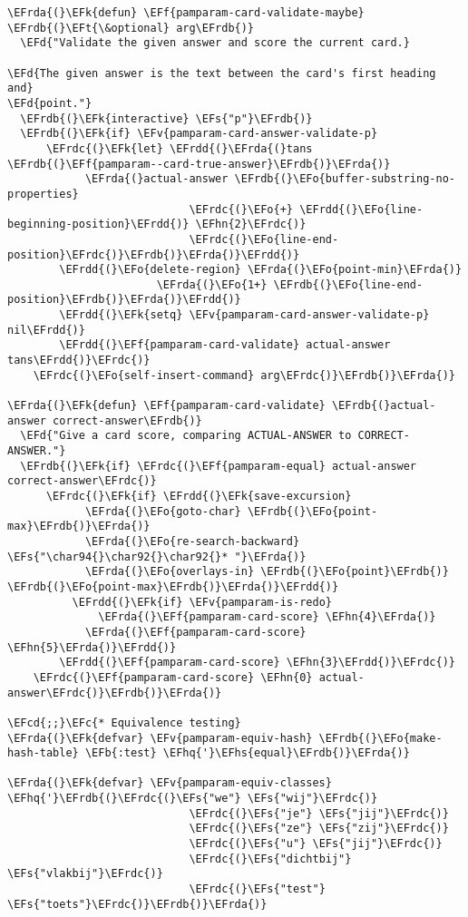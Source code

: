 \documentclass[a4wide,10pt]{article}
\newcommand{\EFc}[1]{\textcolor{EFc}{#1}} %
\newcommand{\EFcd}[1]{\textcolor{EFcd}{#1}} %
\newcommand{\EFs}[1]{\textcolor{EFs}{#1}} %
\newcommand{\EFd}[1]{\textcolor{EFd}{#1}} %
\newcommand{\EFk}[1]{\textcolor{EFk}{#1}} %
\newcommand{\EFb}[1]{\textcolor{EFb}{#1}} %
\newcommand{\EFf}[1]{\textcolor{EFf}{#1}} %
\newcommand{\EFv}[1]{\textcolor{EFv}{#1}} %
\newcommand{\EFt}[1]{\textcolor{EFt}{#1}} %
\newcommand{\EFo}[1]{\textcolor{EFo}{#1}} %
\newcommand{\EFhn}[1]{\textcolor{EFhn}{\textbf{#1}}} %
\newcommand{\EFhq}[1]{\textcolor{EFhq}{#1}} %
\newcommand{\EFhs}[1]{\textcolor{EFhs}{#1}} %
\newcommand{\EFrda}[1]{\textcolor{EFrda}{#1}} %
\newcommand{\EFrdb}[1]{\textcolor{EFrdb}{#1}} %
\newcommand{\EFrdc}[1]{\textcolor{EFrdc}{#1}} %
\newcommand{\EFrdd}[1]{\textcolor{EFrdd}{#1}} %
\begin{document}
\begin{Code}
\begin{Verbatim}
\EFrda{(}\EFk{defun} \EFf{pamparam-card-validate-maybe} \EFrdb{(}\EFt{\&optional} arg\EFrdb{)}
  \EFd{"Validate the given answer and score the current card.}

\EFd{The given answer is the text between the card's first heading and}
\EFd{point."}
  \EFrdb{(}\EFk{interactive} \EFs{"p"}\EFrdb{)}
  \EFrdb{(}\EFk{if} \EFv{pamparam-card-answer-validate-p}
      \EFrdc{(}\EFk{let} \EFrdd{(}\EFrda{(}tans \EFrdb{(}\EFf{pamparam--card-true-answer}\EFrdb{)}\EFrda{)}
            \EFrda{(}actual-answer \EFrdb{(}\EFo{buffer-substring-no-properties}
                            \EFrdc{(}\EFo{+} \EFrdd{(}\EFo{line-beginning-position}\EFrdd{)} \EFhn{2}\EFrdc{)}
                            \EFrdc{(}\EFo{line-end-position}\EFrdc{)}\EFrdb{)}\EFrda{)}\EFrdd{)}
        \EFrdd{(}\EFo{delete-region} \EFrda{(}\EFo{point-min}\EFrda{)}
                       \EFrda{(}\EFo{1+} \EFrdb{(}\EFo{line-end-position}\EFrdb{)}\EFrda{)}\EFrdd{)}
        \EFrdd{(}\EFk{setq} \EFv{pamparam-card-answer-validate-p} nil\EFrdd{)}
        \EFrdd{(}\EFf{pamparam-card-validate} actual-answer tans\EFrdd{)}\EFrdc{)}
    \EFrdc{(}\EFo{self-insert-command} arg\EFrdc{)}\EFrdb{)}\EFrda{)}

\EFrda{(}\EFk{defun} \EFf{pamparam-card-validate} \EFrdb{(}actual-answer correct-answer\EFrdb{)}
  \EFd{"Give a card score, comparing ACTUAL-ANSWER to CORRECT-ANSWER."}
  \EFrdb{(}\EFk{if} \EFrdc{(}\EFf{pamparam-equal} actual-answer correct-answer\EFrdc{)}
      \EFrdc{(}\EFk{if} \EFrdd{(}\EFk{save-excursion}
            \EFrda{(}\EFo{goto-char} \EFrdb{(}\EFo{point-max}\EFrdb{)}\EFrda{)}
            \EFrda{(}\EFo{re-search-backward} \EFs{"\char94{}\char92{}\char92{}* "}\EFrda{)}
            \EFrda{(}\EFo{overlays-in} \EFrdb{(}\EFo{point}\EFrdb{)} \EFrdb{(}\EFo{point-max}\EFrdb{)}\EFrda{)}\EFrdd{)}
          \EFrdd{(}\EFk{if} \EFv{pamparam-is-redo}
              \EFrda{(}\EFf{pamparam-card-score} \EFhn{4}\EFrda{)}
            \EFrda{(}\EFf{pamparam-card-score} \EFhn{5}\EFrda{)}\EFrdd{)}
        \EFrdd{(}\EFf{pamparam-card-score} \EFhn{3}\EFrdd{)}\EFrdc{)}
    \EFrdc{(}\EFf{pamparam-card-score} \EFhn{0} actual-answer\EFrdc{)}\EFrdb{)}\EFrda{)}

\EFcd{;;}\EFc{* Equivalence testing}
\EFrda{(}\EFk{defvar} \EFv{pamparam-equiv-hash} \EFrdb{(}\EFo{make-hash-table} \EFb{:test} \EFhq{'}\EFhs{equal}\EFrdb{)}\EFrda{)}

\EFrda{(}\EFk{defvar} \EFv{pamparam-equiv-classes} \EFhq{'}\EFrdb{(}\EFrdc{(}\EFs{"we"} \EFs{"wij"}\EFrdc{)}
                            \EFrdc{(}\EFs{"je"} \EFs{"jij"}\EFrdc{)}
                            \EFrdc{(}\EFs{"ze"} \EFs{"zij"}\EFrdc{)}
                            \EFrdc{(}\EFs{"u"} \EFs{"jij"}\EFrdc{)}
                            \EFrdc{(}\EFs{"dichtbij"} \EFs{"vlakbij"}\EFrdc{)}
                            \EFrdc{(}\EFs{"test"} \EFs{"toets"}\EFrdc{)}\EFrdb{)}\EFrda{)}


\end{Verbatim}
\end{Code}
\end{document}

